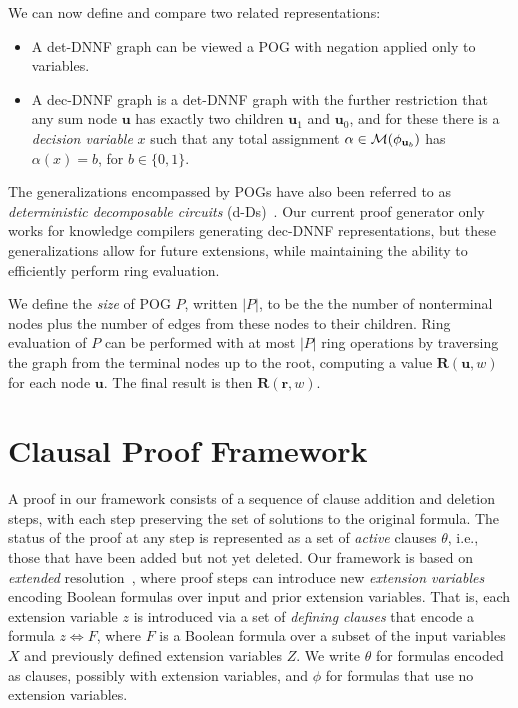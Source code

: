 \documentclass[twoside,11pt]{article}
\newcommand{\varset}{X}
\newcommand{\exvarset}{Z}
\newcommand{\rep}{\textbf{R}}
\newcommand{\ifandonlyif}{\Leftrightarrow}
\newcommand{\assign}{\alpha}
\newcommand{\modelset}{{\cal M}}
\newcommand{\makenode}[1]{\mathbf{#1}}
\newcommand{\nodeu}{\makenode{u}}
\newcommand{\noder}{\makenode{r}}
\begin{document}
We can now define and compare two related representations:
\begin{itemize}
\item A det-DNNF graph can be viewed a POG with negation applied only to variables.
\item A dec-DNNF graph is a det-DNNF graph with the further restriction that any
  sum node $\nodeu$ has exactly two children $\nodeu_1$ and $\nodeu_0$, and for these there is a \emph{decision variable} $x$ such that
  any total assignment $\assign \in  \modelset(\phi_{\nodeu_b})$ has $\assign(x)=b$, for $b \in \{0,1\}$.
\end{itemize}
The generalizations encompassed by POGs have also been referred to as \emph{deterministic decomposable circuits} (d-Ds)~\cite{monet:amw:2018}.
Our current proof generator only works for knowledge compilers
generating dec-DNNF representations, but these generalizations
allow for future extensions, while maintaining the ability to
efficiently perform ring evaluation.


We define the \emph{size} of POG $P$, written $|P|$, to be the
the number of nonterminal nodes plus the number of edges from these nodes to their children.  Ring
evaluation of $P$ can be performed with at most $|P|$ ring
operations by traversing the graph from the terminal nodes up to
the root, computing a value $\rep(\nodeu, w)$ for each node $\nodeu$.
The final result is then $\rep(\noder, w)$.



\section{Clausal Proof Framework}
\label{sect:clausal}

A proof in our framework consists of a sequence of clause addition and
deletion steps, with each step preserving the set of solutions to the
original formula.  The status of the proof at any step is represented
as a set of \emph{active} clauses $\theta$, i.e., those that have been
added but not yet deleted.  Our framework is based on \emph{extended}
resolution~\cite{Tseitin:1983}, where proof steps can introduce new
\emph{extension variables} encoding Boolean formulas over input and
prior extension variables.  That is, each extension variable $z$ is
introduced via a set of \emph{defining clauses} that encode a formula
$z \ifandonlyif F$, where $F$ is a Boolean formula over a subset of the input
variables $\varset$ and previously defined extension variables $\exvarset$.
We write $\theta$ for
formulas encoded as clauses, possibly with extension variables, and
$\phi$ for formulas
that use no extension variables.
\end{document}
